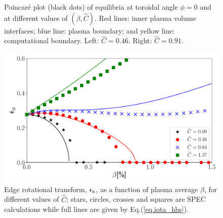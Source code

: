 \documentclass[my_thesis.tex]{subfiles}
\begin{document}
\begin{figure}
	\caption{Poincar\'e plot (black dots) of equilibria at toroidal angle $\phi=0$ and at different values of $(\beta,\hat{C})$. Red lines: inner plasma volume interfaces; blue line: plasma boundary; and yellow line: computational boundary.  Left: $\hat{C}=0.46$. Right: $\hat{C}=0.91$.}
	\label{fig. poincare}
\end{figure}



\begin{figure}
	\centering
	\includegraphics[width=\linewidth]{images/ClassicalStellaratorBetaLimit/iota_edge.pdf}
	\caption{Edge rotational transform, $\text{$\iota\!\!$-}_a$, as a function of plasma average $\beta$, for different values of $\hat{C}$; stars, circles, crosses and squares are SPEC calculations while full lines are given by Eq.(\ref{eq.iota_hbs}).}
	\label{fig. iota edge}
\end{figure}
\end{document}
